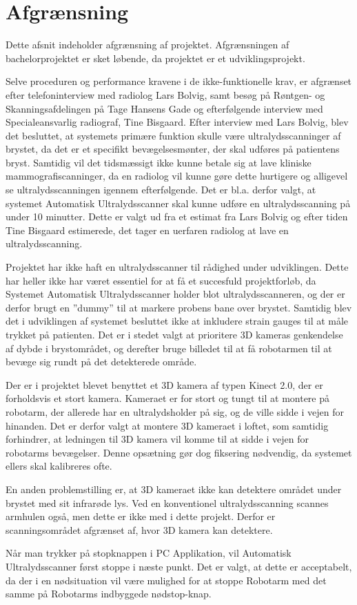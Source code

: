 \chapter{Afgrænsning}
\label{Afgransning}
Dette afsnit indeholder afgrænsning af projektet. Afgrænsningen af bachelorprojektet er sket løbende, da projektet er et udviklingsprojekt.

Selve proceduren og performance kravene i de ikke-funktionelle krav, er afgrænset efter telefoninterview med radiolog Lars Bolvig, samt besøg på Røntgen- og Skanningsafdelingen på Tage Hansens Gade og efterfølgende interview med Specialeansvarlig radiograf, Tine Bisgaard. Efter interview med Lars Bolvig, blev det besluttet, at systemets primære funktion skulle være ultralydsscanninger af brystet, da det er et specifikt bevægelsesmønter, der skal udføres på patientens bryst. Samtidig vil det tidsmæssigt ikke kunne betale sig at lave kliniske mammografiscanninger, da en radiolog vil kunne gøre dette hurtigere og alligevel se ultralydsscanningen igennem efterfølgende. Det er bl.a. derfor valgt, at systemet Automatisk Ultralydsscanner skal kunne udføre en ultralydsscanning på under 10 minutter. Dette er valgt ud fra et estimat fra Lars Bolvig og efter tiden Tine Bisgaard estimerede, det tager en uerfaren radiolog at lave en ultralydsscanning. 

Projektet har ikke haft en ultralydsscanner til rådighed under udviklingen. Dette har heller ikke har været essentiel for at få et succesfuld projektforløb, da Systemet Automatisk Ultralydsscanner holder blot ultralydsscanneren, og der er derfor brugt en ”dummy” til at markere probens bane over brystet. Samtidig blev det i udviklingen af systemet besluttet ikke at inkludere strain gauges til at måle trykket på patienten. Det er i stedet valgt at prioritere 3D kameras genkendelse af dybde i brystområdet, og derefter bruge billedet til at få robotarmen til at bevæge sig rundt på det detekterede område. 

Der er i projektet blevet benyttet et 3D kamera af typen Kinect 2.0, der er forholdsvis et stort kamera. Kameraet er for stort og tungt til at montere på robotarm, der allerede har en ultralydsholder på sig, og de ville sidde i vejen for hinanden. Det er derfor valgt at montere 3D kameraet i loftet, som samtidig forhindrer, at ledningen til 3D kamera vil komme til at sidde i vejen for robotarms bevægelser. Denne opsætning gør dog fiksering nødvendig, da systemet ellers skal kalibreres ofte.

En anden problemstilling er, at 3D kameraet ikke kan detektere området under brystet med sit infrarøde lys. Ved en konventionel ultralydsscanning scannes armhulen også, men dette er ikke med i dette projekt. Derfor er scanningsområdet afgrænset af, hvor 3D kamera kan detektere.

Når man trykker på stopknappen i PC Applikation, vil Automatisk Ultralydsscanner først stoppe i næste punkt. Det er valgt, at dette er acceptabelt, da der i en nødsituation vil være mulighed for at stoppe Robotarm med det samme på Robotarms indbyggede nødstop-knap. 

